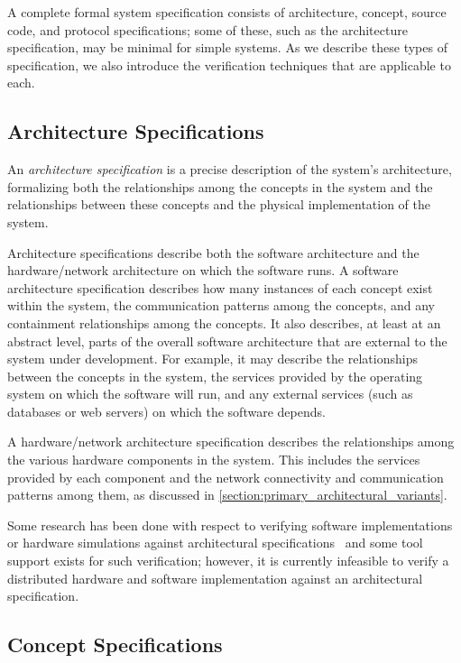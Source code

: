 A complete formal system specification consists of architecture,
concept, source code, and protocol specifications; some of these, such
as the architecture specification, may be minimal for simple
systems. As we describe these types of specification, we also
introduce the verification techniques that are applicable to each.

\subsection{Architecture Specifications}

An \emph{architecture specification} is a precise description of the
system's architecture, formalizing both the relationships among the
concepts in the system and the relationships between these concepts
and the physical implementation of the system. 

Architecture specifications describe both the software architecture
and the hardware/network architecture on which the software runs. A
software architecture specification describes how many instances of
each concept exist within the system, the communication patterns among
the concepts, and any containment relationships among the concepts. It
also describes, at least at an abstract level, parts of the overall
software architecture that are external to the system under
development. For example, it may describe the relationships between
the concepts in the system, the services provided by the operating
system on which the software will run, and any external services (such
as databases or web servers) on which the software depends.

A hardware/network architecture specification describes the
relationships among the various hardware components in the
system. This includes the services provided by each component and the
network connectivity and communication patterns among them, as
discussed in \autoref{section:primary_architectural_variants}.

Some research has been done with respect to verifying software
implementations or hardware simulations against architectural
specifications~\cite{Linhares07, Abdoul08} and some tool support
exists for such verification; however, it is currently infeasible to
verify a distributed hardware and software implementation against an
architectural specification.

\subsection{Concept Specifications}


